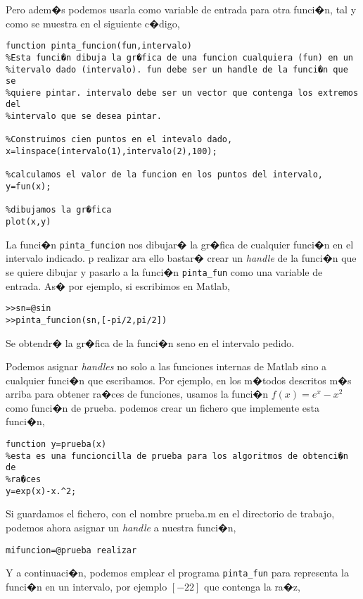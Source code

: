 Pero adem�s podemos usarla como variable de entrada para otra funci�n, tal y como se muestra en el siguiente c�digo,

\begin{verbatim}
function pinta_funcion(fun,intervalo)
%Esta funci�n dibuja la gr�fica de una funcion cualquiera (fun) en un
%itervalo dado (intervalo). fun debe ser un handle de la funci�n que se
%quiere pintar. intervalo debe ser un vector que contenga los extremos del
%intervalo que se desea pintar.

%Construimos cien puntos en el intevalo dado,
x=linspace(intervalo(1),intervalo(2),100);

%calculamos el valor de la funcion en los puntos del intervalo,
y=fun(x);

%dibujamos la gr�fica
plot(x,y)
\end{verbatim}

La funci�n \texttt{pinta\_funcion} nos dibujar� la gr�fica de cualquier funci�n en el intervalo indicado. p realizar ara ello bastar� crear un \emph{handle} de la funci�n que se quiere dibujar y pasarlo a la funci�n \texttt{pinta\_fun} como una variable de entrada. As� por ejemplo, si escribimos en Matlab,

\begin{verbatim}
>>sn=@sin
>>pinta_funcion(sn,[-pi/2,pi/2])
\end{verbatim}

Se obtendr� la gr�fica de la funci�n seno en el intervalo pedido.

Podemos asignar \emph{handles} no solo a las funciones internas de Matlab sino a cualquier funci�n que escribamos. Por ejemplo, en los m�todos descritos m�s arriba para obtener ra�ces de funciones, usamos la funci�n $f(x)=e^x-x^2$ como funci�n de prueba. podemos crear un fichero que implemente esta funci�n,

\begin{verbatim}
function y=prueba(x)
%esta es una funcioncilla de prueba para los algoritmos de obtenci�n de
%ra�ces
y=exp(x)-x.^2;
\end{verbatim}

Si guardamos el fichero, con el nombre prueba.m en el directorio de trabajo, podemos ahora asignar un \emph{handle} a nuestra funci�n,
\begin{verbatim}
mifuncion=@prueba realizar 
\end{verbatim}

Y a continuaci�n, podemos emplear el programa \texttt{pinta\_fun} para representa la funci�n en un intervalo, por ejemplo $[-2 2]$ que contenga la ra�z,

